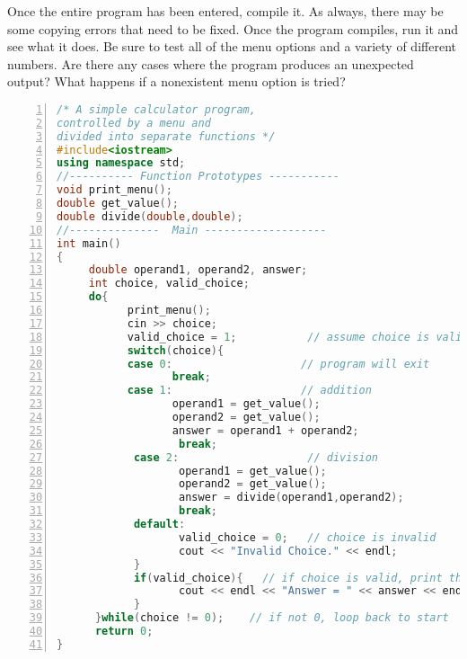 Once the entire program has been entered, compile it.  As always, there may be some copying errors that need to be fixed.  Once the program compiles,  run it and see what it does.  Be sure to test all of the menu options and a variety of different numbers.  Are there any cases where the program produces an unexpected output?  What happens if a nonexistent menu option is tried?

\begin{minipage}{\textwidth}
\renewcommand*\thelstnumber{{\the\value{lstnumber}}}
\begin{lstlisting}[language=C++,numbers = left,xleftmargin=4.0ex, basicstyle=\small, emph={operand1,operand2,answer,choice,valid_choice},emphstyle = \color{\mycolor},
showstringspaces=false,
caption = {The code for the \codefont{main()} function and the prototypes for the other functions in the calculator program.},label = {listing:calc}]
/* A simple calculator program,
controlled by a menu and 
divided into separate functions */
#include<iostream>
using namespace std;
//---------- Function Prototypes -----------
void print_menu();
double get_value();
double divide(double,double);
//--------------  Main -------------------
int main()
{
     double operand1, operand2, answer;
     int choice, valid_choice;
     do{
           print_menu();
           cin >> choice;
           valid_choice = 1;           // assume choice is valid
           switch(choice){
           case 0:                    // program will exit
                  break;
           case 1:                    // addition
                  operand1 = get_value();
                  operand2 = get_value();
                  answer = operand1 + operand2;
                   break;
            case 2:                    // division
                   operand1 = get_value();
                   operand2 = get_value();
                   answer = divide(operand1,operand2);
                   break;
            default:
                   valid_choice = 0;   // choice is invalid
                   cout << "Invalid Choice." << endl;
            }
            if(valid_choice){   // if choice is valid, print the answer
                   cout << endl << "Answer = " << answer << endl;
            }
      }while(choice != 0);    // if not 0, loop back to start
      return 0;
}
\end{lstlisting}
\end{minipage}


